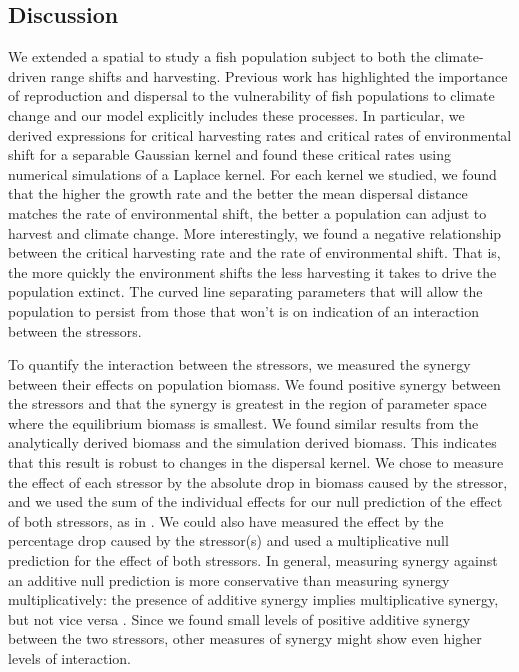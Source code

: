 \documentclass[12pt,english]{article}
\begin{document}
\begin{spacing}{1.9}
\begin{flushleft}
\section{Discussion}

We extended a spatial to study a fish population subject to both the climate-driven range shifts and harvesting. Previous work has highlighted the importance of reproduction and dispersal to the vulnerability of fish populations to climate change \citep[\citet{Fordhametal2013}]{Hastingsetal2005} and our model explicitly includes these processes.  In particular, we derived expressions for critical harvesting rates and critical rates of environmental shift for a separable Gaussian kernel and found these critical rates using numerical simulations of a Laplace kernel.  For each kernel we studied, we found that the higher the growth rate and the better the mean dispersal distance matches the rate of environmental shift, the better a population can adjust to harvest and climate change.  More interestingly, we found a negative relationship between the critical harvesting rate and the rate of environmental shift.  That is, the more quickly the environment shifts the less harvesting it takes to drive the population extinct.  The curved line separating parameters that will allow the population to persist from those that won't is on indication of an interaction between the stressors.


To quantify the interaction between the stressors, we measured the synergy between their effects on population biomass.  We found positive synergy between the stressors and that the synergy is greatest in the region of parameter space where the equilibrium biomass is smallest.  We found similar results from the analytically derived biomass and the simulation derived biomass. This indicates that this result is robust to changes in the dispersal kernel.  We chose to measure the effect of each stressor by the absolute drop in biomass caused by the stressor, and we used the sum of the individual effects for our null prediction of the effect of both stressors, as in \citep{Crainetal2008, DarlingCote2008,Nyeetal2013}.  We could also have measured the effect by the percentage drop caused by the stressor(s) and used a multiplicative null prediction for the effect of both stressors.  In general, measuring synergy against an additive null prediction is more conservative than measuring synergy multiplicatively: the presence of additive synergy implies multiplicative synergy, but not vice versa \citep{Crainetal2008, Foltetal1999}.  Since we found small levels of positive additive synergy between the two stressors, other measures of synergy might show even higher levels of interaction. 


\end{flushleft}
\end{spacing}
\end{document}
